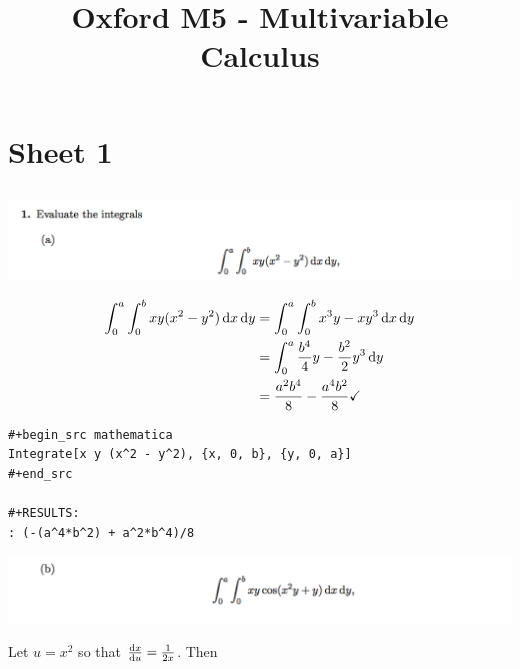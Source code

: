 \documentclass[12pt]{article}
\begin{document}
\title{Oxford M5 - Multivariable Calculus
  }
\author{}
\date{}
\maketitle


\section{Sheet 1}

\subsection{}
\begin{mdframed}
  \includegraphics[width=400pt]{img/oxford-prelims-M5-multivariable-calc-1-1-a.png}
\end{mdframed}

\begin{align*}
  \int_0^a\int_0^b xy(x^2 - y^2)\dx\dy
  &= \int_0^a\int_0^b x^3y - xy^3\dx\dy\\
  &= \int_0^a\frac{b^4}{4}y - \frac{b^2}{2}y^3\dy\\
  &= \frac{a^2b^4}{8} - \frac{a^4b^2}{8} \checkmark
\end{align*}

\begin{verbatim}
#+begin_src mathematica
Integrate[x y (x^2 - y^2), {x, 0, b}, {y, 0, a}]
#+end_src

#+RESULTS:
: (-(a^4*b^2) + a^2*b^4)/8

\end{verbatim}


\newpage
\begin{mdframed}
  \includegraphics[width=400pt]{img/oxford-prelims-M5-multivariable-calc-1-1-b.png}
\end{mdframed}

Let $u = x^2$ so that $\dxdu = \frac{1}{2x}$. Then
\end{document}
